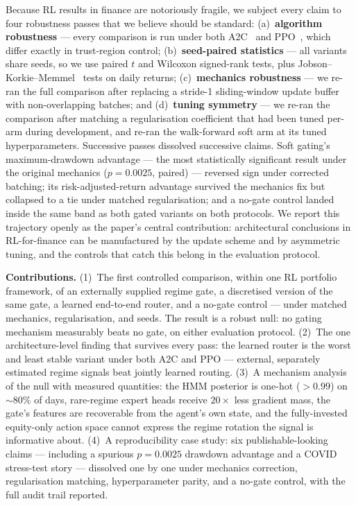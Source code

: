\documentclass[sigconf,anonymous,review]{acmart}
\begin{document}
Because RL results in finance are notoriously fragile, we subject every
claim to four robustness passes that we believe should be standard:
(a)~\textbf{algorithm robustness} --- every comparison is run under both
A2C~\cite{mnih2016a2c} and PPO~\cite{schulman2017ppo}, which differ exactly
in trust-region control; (b)~\textbf{seed-paired statistics} --- all
variants share seeds, so we use paired $t$ and Wilcoxon signed-rank tests,
plus Jobson--Korkie--Memmel~\cite{jobson1981,memmel2003} tests on daily
returns; (c)~\textbf{mechanics robustness} --- we re-ran the full
comparison after replacing a stride-1 sliding-window update buffer with
non-overlapping batches; and (d)~\textbf{tuning symmetry} --- we re-ran
the comparison after matching a regularisation coefficient that had been
tuned per-arm during development, and re-ran the walk-forward soft arm at
its tuned hyperparameters. Successive passes dissolved successive claims.
Soft gating's maximum-drawdown advantage --- the most statistically
significant result under the original mechanics ($p{=}0.0025$, paired) ---
reversed sign under corrected batching; its risk-adjusted-return
advantage survived the mechanics fix but collapsed to a tie under matched
regularisation; and a no-gate control landed inside the same band as both
gated variants on both protocols. We report this trajectory openly as the
paper's central contribution: architectural conclusions in RL-for-finance
can be manufactured by the update scheme and by asymmetric tuning, and
the controls that catch this belong in the evaluation protocol.

\textbf{Contributions.}
(1)~The first controlled comparison, within one RL portfolio framework, of
an externally supplied regime gate, a discretised version of the same
gate, a learned end-to-end router, and a no-gate control --- under matched
mechanics, regularisation, and seeds. The result is a robust null: no
gating mechanism measurably beats no gate, on either evaluation protocol.
(2)~The one architecture-level finding that survives every pass: the
learned router is the worst and least stable variant under both A2C and
PPO --- external, separately estimated regime signals beat jointly
learned routing.
(3)~A mechanism analysis of the null with measured quantities: the HMM
posterior is one-hot ($>0.99$) on ${\sim}80\%$ of days, rare-regime
expert heads receive $20\times$ less gradient mass, the gate's features
are recoverable from the agent's own state, and the fully-invested
equity-only action space cannot express the regime rotation the signal
is informative about.
(4)~A reproducibility case study: six publishable-looking claims ---
including a spurious $p{=}0.0025$ drawdown advantage and a COVID
stress-test story --- dissolved one by one under mechanics correction,
regularisation matching, hyperparameter parity, and a no-gate control,
with the full audit trail reported.
\end{document}
